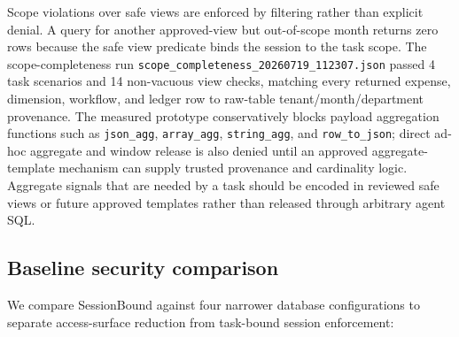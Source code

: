 \documentclass[journal]{IEEEtran}
\begin{document}
Scope violations over safe views are enforced by filtering rather than
explicit denial. A query for another approved-view but out-of-scope
month returns zero rows because the safe view predicate binds the
session to the task scope. The scope-completeness run
\texttt{scope\_completeness\_20260719\_112307.json} passed 4 task
scenarios and 14 non-vacuous view checks, matching every returned
expense, dimension, workflow, and ledger row to raw-table
tenant/month/department provenance. The measured prototype conservatively blocks
payload aggregation functions such as \texttt{json\_agg},
\texttt{array\_agg}, \texttt{string\_agg}, and \texttt{row\_to\_json};
direct ad-hoc aggregate and window release is also denied until an
approved aggregate-template mechanism can supply trusted provenance and
cardinality logic. Aggregate signals that are needed by a task should be
encoded in reviewed safe views or future approved templates rather than
released through arbitrary agent SQL.

\hypertarget{baseline-security-comparison}{%
\subsection{Baseline security comparison}\label{baseline-security-comparison}}

We compare SessionBound against four narrower database configurations to
separate access-surface reduction from task-bound session enforcement:
\end{document}
